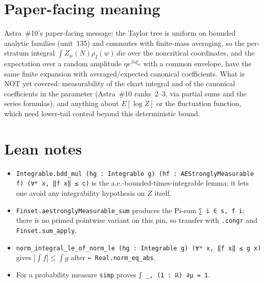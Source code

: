\documentclass[11pt]{article}
\begin{document}
\section{Paper-facing meaning}

Astra~\#10's paper-facing message: the Taylor tree is uniform on bounded analytic families
(unit~135) and commutes with finite-mass averaging, so the per-stratum integral
$\int Z_w(N)\rho_I(w)\,dw$ over the noncritical coordinates, and the expectation over a random
amplitude $\eta e^{\beta s\xi_n}$ with a common envelope, have the same finite expansion with
averaged/expected canonical coefficients. What is NOT yet covered: measurability of the chart
integral and of the canonical coefficients in the parameter (Astra~\#10 ranks~2--3, via partial sums
and the series formulas), and anything about $E[\log Z]$ or the fluctuation function, which need
lower-tail control beyond this deterministic bound.

\section{Lean notes}

\begin{itemize}
\item \texttt{Integrable.bdd\_mul (hg : Integrable g) (hf : AEStronglyMeasurable f) (∀ᵐ x, ‖f x‖ ≤
c)} is the a.e.-bounded-times-integrable lemma; it lets one avoid any integrability hypothesis on
$Z$ itself.
\item \texttt{Finset.aestronglyMeasurable\_sum} produces the Pi-sum \texttt{∑ i ∈ s, f i}; there is
no primed pointwise variant on this pin, so transfer with \texttt{.congr} and
\texttt{Finset.sum\_apply}.
\item \texttt{norm\_integral\_le\_of\_norm\_le (hg : Integrable g) (∀ᵐ x, ‖f x‖ ≤ g x)} gives
$|\int f|\le\int g$ after \texttt{← Real.norm\_eq\_abs}.
\item For a probability measure \texttt{simp} proves \texttt{∫ \_, (1 : ℝ) ∂μ = 1}.
\end{itemize}
\end{document}
